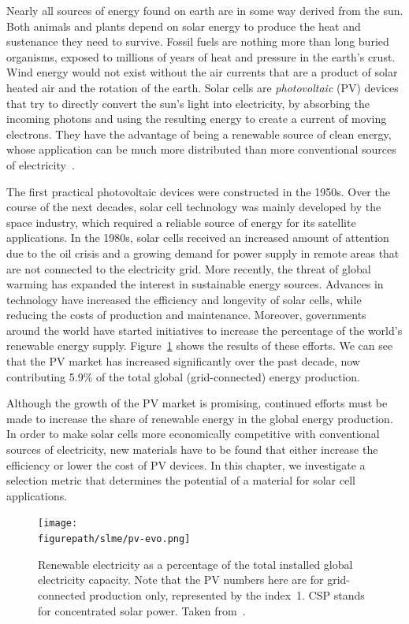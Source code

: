 \begin{refsection}
Nearly all sources of energy found on earth are in some way derived from the 
sun. Both animals and plants depend on solar energy to produce the heat and 
sustenance they need to survive. Fossil fuels are nothing more than long 
buried organisms, exposed to millions of years of heat and pressure in the 
earth's crust. Wind energy would not exist without the air currents that are a 
product of solar heated air and the rotation of the earth. Solar cells are 
\textit{photovoltaic} (PV) devices that try to directly convert the sun's 
light into electricity, by absorbing the incoming photons and using the 
resulting energy to create a current of moving electrons. They have the 
advantage of being a renewable source of clean energy, whose application can 
be much more distributed than more conventional sources of 
electricity~\cite{Marsden2011}. 
 
The first practical photovoltaic devices were constructed in the 1950s. Over 
the course of the next decades, solar cell technology was mainly developed by 
the space industry, which required a reliable source of energy for its 
satellite applications. In the 1980s, solar cells received an increased amount 
of attention due to the oil crisis and a growing demand for power supply in 
remote areas that are not connected to the electricity grid. More recently, 
the threat of global warming has expanded the interest in sustainable energy 
sources. Advances in technology have increased the efficiency and longevity of 
solar cells, while reducing the costs of production and maintenance. 
Moreover, governments around the world have started initiatives to increase the 
percentage of the world's renewable energy supply. 
Figure~\ref{slme:fig-pv_evo} shows the results of these efforts. We can see 
that the PV market has increased significantly over the past decade, now 
contributing 5.9\% of the total global (grid-connected) energy production. 
 
Although the growth of the PV market is promising, continued efforts must be 
made to increase the share of renewable energy in the global energy 
production. In order to make solar cells more economically competitive with 
conventional sources of electricity, new materials have to be found that 
either increase the efficiency or lower the cost of PV devices. In this 
chapter, we investigate a selection metric that determines the potential of a 
material for solar cell applications. 
 
\begin{figure}[hb]  
\centering 
\texttt{[image: \\figurepath/slme/pv-evo.png]} 
\caption{Renewable electricity as a percentage of the total installed global 
electricity capacity. Note that the PV numbers here are for grid-connected production only, represented by the index~1. CSP stands for concentrated solar power. Taken from~\cite{NREL2017}.} 
\label{slme:fig-pv_evo}  
\end{figure} 


\end{refsection}
